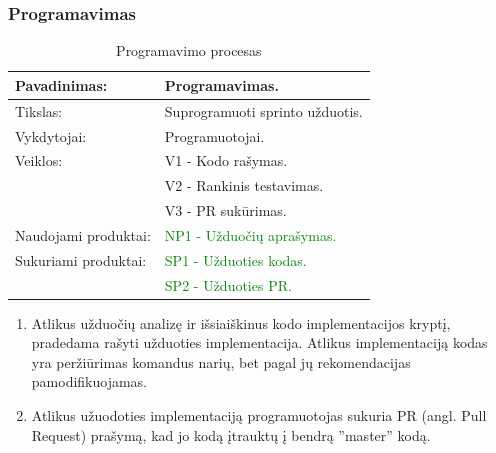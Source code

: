 \documentclass{VUMIFPSkursinis}
\begin{document}
	\subsubsection{Programavimas}
	\begin{center}
		\begin{table}[ht]
			\caption{Programavimo procesas}
			\begin{tabular}{ | l | l | }
				\hline
				Pavadinimas:		& Programavimas.			\\ \hline
				Tikslas:		& Suprogramuoti sprinto užduotis.	\\ \hline
				Vykdytojai:		& Programuotojai.			\\ \hline
				Veiklos:		& V1 - Kodo rašymas.			\\
							& V2 - Rankinis testavimas. 		\\
							& V3 - PR sukūrimas.			\\ \hline
				Naudojami produktai:	&\textcolor{green}{ NP1 - Užduočių aprašymas.}	\\ \hline
				Sukuriami produktai:	&\textcolor{green}{ SP1 - Užduoties kodas.}		\\
							& \textcolor{green}{SP2 - Užduoties PR.}			\\ \hline
			\end{tabular}
		\end{table}
	\end{center}
		\begin{enumerate}
			\item{
				Atlikus užduočių analizę ir išsiaiškinus kodo implementacijos kryptį, pradedama rašyti užduoties implementacija.
				Atlikus implementaciją kodas yra peržiūrimas komandus narių, bet pagal jų rekomendacijas pamodifikuojamas.
			}
			\item{Atlikus užuodoties implementaciją programuotojas sukuria PR (angl. Pull Request) prašymą, kad jo kodą įtrauktų į bendrą ''master'' kodą.}
		\end{enumerate}
\end{document}
